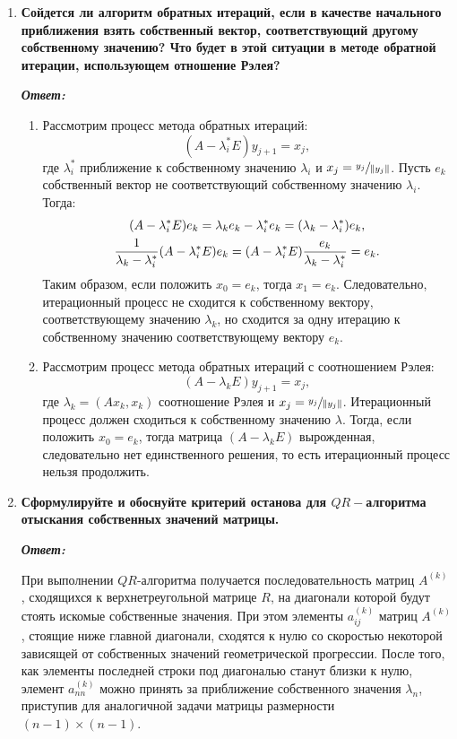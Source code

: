 \documentclass[12pt, a4paper]{article}
\newcommand{\norm}[1]{\lVert #1 \rVert}
\begin{document}
\begin{enumerate}
	\item \textbf{Сойдется ли алгоритм обратных итераций, если в качестве начального приближения взять собственный вектор, соответствующий другому собственному значению? Что будет в этой ситуации в методе обратной итерации, использующем отношение Рэлея?}
	
	\vspace*{0.2cm}
	
	\textit{\textbf{Ответ:}}
	\begin{enumerate}
		\item Рассмотрим процесс метода обратных итераций:
		\[
		(A - \lambda^{*}_i E)y_{j+1} = x_j,
		\] 
		 где $\lambda^{*}_i$ приближение к собственному значению $\lambda_i$ и $x_{j} = \sfrac{y_j}{\norm{y_{j}}}$. Пусть $e_k$ собственный вектор не соответствующий собственному значению $\lambda_i$. Тогда:
		 \begin{gather}
		 (A - \lambda^{*}_i E) e_k = \lambda_k e_k - \lambda^*_i e_k = (\lambda_k - \lambda^*_i) e_k, \notag \\
		 \frac{1}{\lambda_k - \lambda^*_i}(A - \lambda^{*}_i E) e_k = (A - \lambda^{*}_i E)\frac{e_k}{\lambda_k - \lambda^*_i} =  e_k.
		 \end{gather}
		 Таким образом, если положить $x_0 = e_k$, тогда $x_1 = e_k$. Следовательно, итерационный процесс не сходится к собственному вектору, соответствующему значению  $\lambda_k$, но сходится за одну итерацию к собственному значению соответствующему вектору $e_k$.
		 
		 \item Рассмотрим процесс метода обратных итераций с соотношением Рэлея:
		 \[
		 (A - \lambda_k E)y_{j+1} = x_j,
		 \] 
		 где $\lambda_k = (A x_k, x_k)$ соотношение Рэлея и $x_{j} = \sfrac{y_j}{\norm{y_{j}}}$. Итерационный процесс должен сходиться к  собственному значению $\lambda$. Тогда, если положить $x_0 = e_k$, тогда матрица $(A - \lambda_k E)$ вырожденная, следовательно нет единственного решения, то есть итерационный процесс нельзя продолжить.
	\end{enumerate}
	
	\item \textbf{Сформулируйте и обоснуйте критерий останова для $QR-$алгоритма отыскания собственных значений матрицы.}
	\vspace*{0.2cm}
	
	\textit{\textbf{Ответ:}}
	
	При выполнении $QR$-алгоритма получается последовательность матриц $A^{(k)}$, сходящихся к верхнетреугольной матрице $R$, на диагонали которой будут стоять искомые собственные значения. При этом элементы $a^{(k)}_{ij}$ матриц $A^{(k)}$, стоящие ниже главной диагонали, сходятся к нулю со скоростью некоторой зависящей от собственных значений геометрической прогрессии. После того, как элементы последней строки под диагональю станут близки к нулю, элемент $a^{(k)}_{nn}$ можно принять за приближение собственного значения $\lambda_n$, приступив для аналогичной задачи матрицы размерности $(n-1) \times (n-1)$.
	

\end{enumerate}
\end{document}
